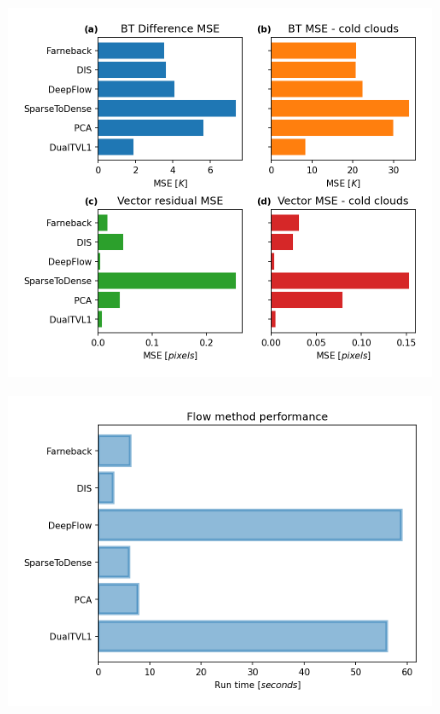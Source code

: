\begin{figure}[t]
    \includegraphics[width=\textwidth]{figures/chapter1_12.png}
    \caption[
    The mean square error of the \acrshort{bt} difference and residual motion vector magnitude for different optical flow methods
    ]{}
    \label{fig:opt_flow_mse}
\end{figure}

\begin{figure}[t]
    \includegraphics[width=\textwidth]{figures/chapter1_13.png}
    \caption[
    The performance cost of different optical flow methods
    ]{}
    \label{fig:opt_flow_cost}
\end{figure}


